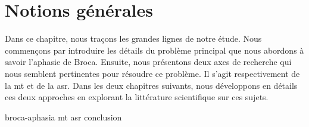\chapter{Notions générales}
\label{chap.general-notions}

Dans ce chapitre, nous traçons les grandes lignes de notre étude.
Nous commençons par introduire les détails du problème principal que nous abordons à savoir l'aphasie de Broca.
Ensuite, nous présentons deux axes de recherche qui nous semblent pertinentes pour résoudre ce problème.
Il s'agit respectivement de la \gls{mt} et de la \gls{asr}.
Dans les deux chapitres suivants, 
nous développons en détails ces deux approches
en explorant la littérature scientifique sur ces sujets.

{broca-aphasia}
{mt}
{asr}
{conclusion}
